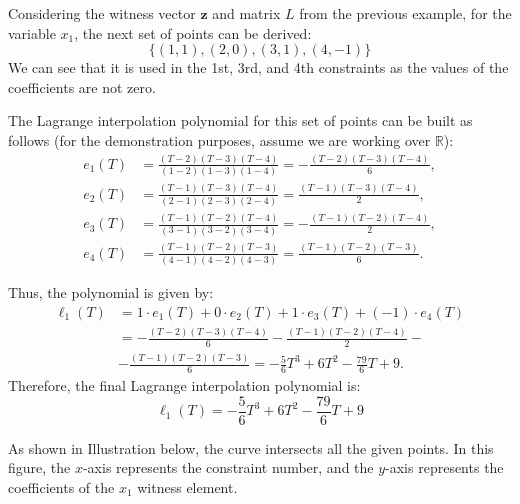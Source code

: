 \documentclass[../../book.tex]{subfiles}
\begin{document}
\begin{example}
    Considering the witness vector $\mathbf{z}$ and matrix $L$ from the previous example, for the variable
    $x_1$, the next set of points can be derived:
    \begin{equation*}
        \{(1,1), (2,0), (3,1), (4,-1)\}
    \end{equation*}
    We can see that it is used in the 1st, 3rd, and 4th constraints as the values of the coefficients
    are not zero.
    
    The Lagrange interpolation polynomial for this set of points can be built as
    follows (for the demonstration purposes, assume we are working over
    $\mathbb{R}$):
    \begin{align*}
        e_1(T) &= \frac{(T - 2)(T - 3)(T - 4)}{(1 - 2)(1 - 3)(1 - 4)} = -\frac{(T - 2)(T - 3)(T - 4)}{6}, \\
        e_2(T) &= \frac{(T - 1)(T - 3)(T - 4)}{(2 - 1)(2 - 3)(2 - 4)} = \frac{(T - 1)(T - 3)(T - 4)}{2}, \\
        e_3(T) &= \frac{(T - 1)(T - 2)(T - 4)}{(3 - 1)(3 - 2)(3 - 4)} = -\frac{(T - 1)(T - 2)(T - 4)}{2}, \\
        e_4(T) &= \frac{(T - 1)(T - 2)(T - 3)}{(4 - 1)(4 - 2)(4 - 3)} = \frac{(T - 1)(T - 2)(T - 3)}{6}.
    \end{align*}

    Thus, the polynomial is given by:
    \begin{equation*}
        \begin{aligned}
            \ell_1(T) &= 1 \cdot e_1(T) + 0 \cdot e_2(T) + 1 \cdot e_3(T) + (-1) \cdot e_4(T) \\
            &= -\frac{(T - 2)(T - 3)(T - 4)}{6} - \frac{(T - 1)(T - 2)(T - 4)}{2} - \\ 
            &- \frac{(T - 1)(T - 2)(T - 3)}{6} = -\frac{5}{6}T^3 + 6T^2 - \frac{79}{6}T + 9.
        \end{aligned}
    \end{equation*}
    Therefore, the final Lagrange interpolation polynomial is:
    \begin{equation*}
        \ell_1(T) = -\frac{5}{6}T^3 + 6T^2 - \frac{79}{6}T + 9
    \end{equation*}

    As shown in Illustration below, the curve intersects all the given points.
    In this figure, the $x$-axis represents the constraint number, and the
    $y$-axis represents the coefficients of the $x_1$ witness element.


\end{example}
\end{document}
